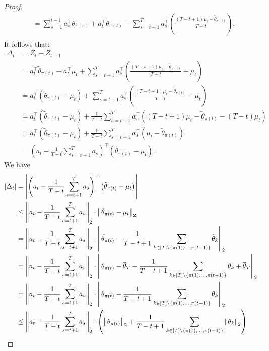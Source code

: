 \begin{proof}
\begin{align*}
    &= \sum_{s=1}^{t - 1} a_s^\top\tilde{\theta}_{\pi(s)}  + a_t^\top\tilde{\theta}_{\pi(t)} + \sum_{s = t +1}^T a_s^\top\left(\frac{(T-t+1)\mu_t - \tilde{\theta}_{\pi(t)}}{T-t}\right).\\
    \end{align*}
It follows that:
\begin{align*}
    \Delta_{t} &= Z_t - Z_{t-1} \\
    &= a_t^\top\tilde{\theta}_{\pi(t)} - a_t^\top\mu_t+ \sum_{s = t +1}^T a_s^\top  \left(\frac{(T-t+1)\mu_t - \tilde{\theta}_{\pi(t)}}{T-t}  - \mu_t\right)\\
    &= a_t^\top\left(\tilde{\theta}_{\pi(t)} - \mu_t\right) + \sum_{s = t +1}^T a_s^\top   \left(\frac{(T-t+1)\mu_t - \tilde{\theta}_{\pi(t)}}{T-t}  - \mu_t\right)\\
    &= a_t^\top\left(\tilde{\theta}_{\pi(t)} -\mu_t\right) + \frac{1}{T-t}\sum_{s = t +1}^T a_s^\top  \left((T-t+1)\mu_t - \tilde{\theta}_{\pi(t)} - (T-t)\mu_t\right)\\
    &= a_t^\top\left(\tilde{\theta}_{\pi(t)} - \mu_t\right) + \frac{1}{T-t}\sum_{s = t +1}^T a_s^\top \left(\mu_t -\tilde{\theta}_{\pi(t)}\right) \\
    &= \left(a_t - \frac{1}{T-t}\sum_{s = t +1}^T a_s\right)^\top\left(\tilde{\theta}_{\pi(t)} - \mu_t\right).
\end{align*}
We have \begin{align*}
    |\Delta_{t}| &= \left|\left(a_t - \frac{1}{T-t}\sum_{s = t +1}^T a_s\right)^\top\left(\tilde{\theta}_{\pi(t)} - \mu_t\right)\right| \\
    &\leq \left\|a_t - \frac{1}{T-t}\sum_{s = t +1}^T a_s\right\|_2 \cdot \left\|\tilde{\theta}_{\pi(t)} - \mu_t\right\|_2 \\
    &= \left\|a_t - \frac{1}{T-t}\sum_{s = t +1}^T a_s\right\|_2 \cdot \left\|\tilde{\theta}_{\pi(t)} - \frac{1}{T-t+1}\sum_{k \in [T] \setminus \{\pi(1),\dots,\pi(t-1)\}} \tilde{\theta}_k\right\|_2\\
    &= \left\|a_t - \frac{1}{T-t}\sum_{s = t +1}^T a_s\right\|_2 \cdot \left\|\theta_{\pi(t)} -\otheta_{T} - \frac{1}{T-t+1}\sum_{k \in [T] \setminus \{\pi(1),\dots,\pi(t-1)\}} \theta_k +\otheta_{T}\right\|_2\\
    &= \left\|a_t - \frac{1}{T-t}\sum_{s = t +1}^T a_s\right\|_2 \cdot \left\|\theta_{\pi(t)}  - \frac{1}{T-t+1}\sum_{k \in [T] \setminus \{\pi(1),\dots,\pi(t-1)\}} \theta_k \right\|_2\\
    &\leq \left\|a_t - \frac{1}{T-t}\sum_{s = t +1}^T a_s\right\|_2 \cdot \left(\left\|\theta_{\pi(t)}\right\|_2  + \frac{1}{T-t+1}\sum_{k \in [T] \setminus \{\pi(1),\dots,\pi(t-1)\}} \left\|\theta_k \right\|_2\right)\\

\end{align*}
\end{proof}
